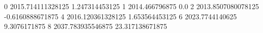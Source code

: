0 2015.714111328125 1.247314453125
1 2014.466796875 0.0
2 2013.8507080078125 -0.6160888671875
4 2016.120361328125 1.653564453125
6 2023.7744140625 9.3076171875
8 2037.783935546875 23.317138671875
